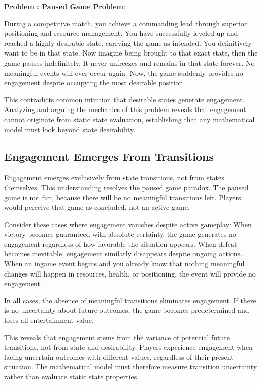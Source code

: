\documentclass{article}
\newcounter{gameproblem}
\newenvironment{gameproblem}[1]{%
    \refstepcounter{gameproblem}%
    \noindent\textbf{Problem \thegameproblem: #1}: %
}{%
    \par\smallskip%
}
\begin{document}
\begin{gameproblem}{Paused Game Problem}
During a competitive match, you achieve a commanding lead through superior positioning and resource management. You have successfully leveled up and reached a highly desirable state, carrying the game as intended. You definitively want to be in that state.
Now imagine being brought to that exact state, then the game pauses indefinitely. It never unfreezes and remains in that state forever. No meaningful events will ever occur again. Now, the game suddenly provides no engagement despite occupying the most desirable position.
\end{gameproblem}

This contradicts common intuition that desirable states generate engagement. Analyzing and arguing the mechanics of this problem reveals that engagement cannot originate from static state evaluation, establishing that any mathematical model must look beyond state desirability.

\subsection{Engagement Emerges From Transitions}

Engagement emerges exclusively from state transitions, not from states themselves. This understanding resolves the paused game paradox. The paused game is not fun, because there will be no meaningful transitions left. Players would perceive that game as concluded, not an active game.

Consider these cases where engagement vanishes despite active gameplay: When victory becomes guaranteed with absolute certainty, the game generates no engagement regardless of how favorable the situation appears. When defeat becomes inevitable, engagement similarly disappears despite ongoing actions. When an ingame event begins and you already know that nothing meaningful changes will happen in resources, health, or positioning, the event will provide no engagement.

In all cases, the absence of meaningful transitions eliminates engagement. If there is no uncertainty about future outcomes, the game becomes predetermined and loses all entertainment value.

This reveals that engagement stems from the variance of potential future transitions, not from state and desirability. Players experience engagement when facing uncertain outcomes with different values, regardless of their present situation. The mathematical model must therefore measure transition uncertainty rather than evaluate static state properties.
\end{document}
